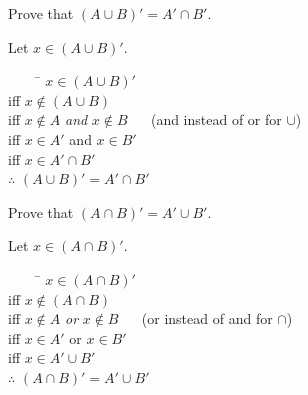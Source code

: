 \documentclass[\main/notes.tex]{subfiles}
\begin{document}
			\begin{example}
				\begin{questions}[before=\raggedright]
					\item Prove that $(A \cup B)' = A' \cap B'$.\\
						\begin{answer}
							\begin{minipage}{0.6\textwidth}
								Let $x \in (A \cup B)'$.
								\begin{tabbing}
									$\qquad$ \= $x \in (A \cup B)'$\\
									iff \> $x \notin (A \cup B)$\\
									iff \> $x \notin A$ \emph{and} $x \notin B$ $\quad$ (and instead of or for $\cup$)\\
									iff \> $x \in A'$ and $x \in B'$\\
									iff \> $x \in A' \cap B'$\\
									$\therefore$ \> $(A \cup B)' = A' \cap B'$
								\end{tabbing}
							\end{minipage}
							\begin{minipage}{0.33\textwidth}
								\begin{center}
									\begin{venntwo}[][]
										\fillNotAorB
									\end{venntwo}
								\end{center}
							\end{minipage}
						\end{answer}
					\item Prove that $(A \cap B)' = A' \cup B'$.\\
						\begin{answer}
							\begin{minipage}{0.6\textwidth}
								Let $x \in (A \cap B)'$.
								\begin{tabbing}
									$\qquad$ \= $x \in (A \cap B)'$\\
									iff \> $x \notin (A \cap B)$\\
									iff \> $x \notin A$ \emph{or} $x \notin B$ $\quad$ (or instead of and for $\cap$)\\
									iff \> $x \in A'$ or $x \in B'$\\
									iff \> $x \in A' \cup B'$\\
									$\therefore$ \> $(A \cap B)' = A' \cup B'$
								\end{tabbing}
							\end{minipage}
							\begin{minipage}{0.33\textwidth}
								\begin{center}
									\begin{venntwo}[][]
										\fillNotA
										\fillNotB
									\end{venntwo}
								\end{center}
							\end{minipage}
						\end{answer}
				\end{questions}
			\end{example}
\end{document}
